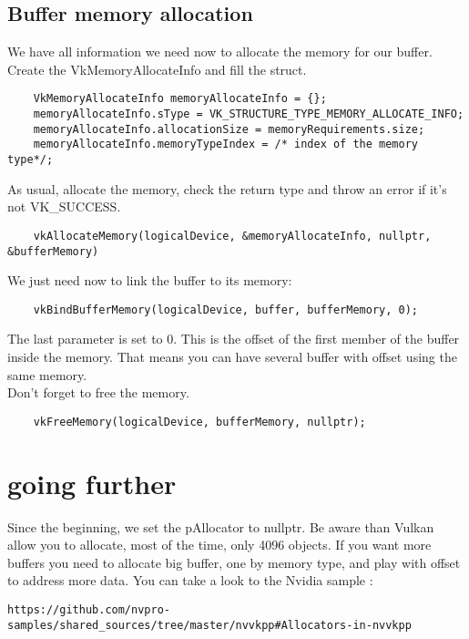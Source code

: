 \documentclass{article}
\begin{document}
\subsection{Buffer memory allocation}
We have all information we need now to allocate the memory for our buffer. Create the VkMemoryAllocateInfo and fill the struct.
\begin{lstlisting}
	VkMemoryAllocateInfo memoryAllocateInfo = {};
	memoryAllocateInfo.sType = VK_STRUCTURE_TYPE_MEMORY_ALLOCATE_INFO;
	memoryAllocateInfo.allocationSize = memoryRequirements.size;
	memoryAllocateInfo.memoryTypeIndex = /* index of the memory type*/;
\end{lstlisting}
As usual, allocate the memory, check the return type and throw an error if it's not VK\_SUCCESS.
\begin{lstlisting}
	vkAllocateMemory(logicalDevice, &memoryAllocateInfo, nullptr, &bufferMemory)
\end{lstlisting}
We just need now to link the buffer to its memory:
\begin{lstlisting}
	vkBindBufferMemory(logicalDevice, buffer, bufferMemory, 0);
\end{lstlisting}
The last parameter is set to 0. This is the offset of the first member of the buffer inside the memory. That means you can have several buffer with offset using the same memory.\\
Don't forget to free the memory.
\begin{lstlisting}
	vkFreeMemory(logicalDevice, bufferMemory, nullptr);
\end{lstlisting}

\section{going further}
Since the beginning, we set the pAllocator to nullptr. Be aware than Vulkan allow you to allocate, most of the time, only 4096 objects. If you want more buffers you need to allocate big buffer, one by memory type, and play with offset to address more data. You can take a look to the Nvidia sample :
\begin{lstlisting}
https://github.com/nvpro-samples/shared_sources/tree/master/nvvkpp#Allocators-in-nvvkpp
\end{lstlisting}
\end{document}
